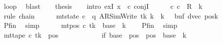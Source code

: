 \begin{isabellebody}
\ loop\ \isamarkupfalse%
\ blast\isanewline
\ \ \isamarkupfalse%
\ {\isacharquery}{\kern0pt}thesis\isanewline
\ \ \isamarkupfalse%
\ {\isacharparenleft}{\kern0pt}intro\ exI{\isacharbrackleft}{\kern0pt}\ x\ {\isacharequal}{\kern0pt}\ c{\isacharprime}{\kern0pt}{\isacharbrackright}{\kern0pt}\ conjI{\isacharparenright}{\kern0pt}\isanewline
\ \ \ \ \isamarkupfalse%
\ {\isachardoublequoteopen}{\isacharparenleft}{\kern0pt}c{}{\isacharcomma}{\kern0pt}\ c{\isacharprime}{\kern0pt}{\isacharparenright}{\kern0pt}\ {\isasymin}\ R{\isacharprime}{\kern0pt}\ {\isacharcircum}{\kern0pt}{\isacharcircum}{\kern0pt}\ {\isacharparenleft}{\kern0pt}{\isacharquery}{\kern0pt}k\ {\isacharminus}{\kern0pt}\ {}{\isacharparenright}{\kern0pt}{\isachardoublequoteclose}\isanewline
\ \ \ \ \ \ \isamarkupfalse%
\ {\isacharparenleft}{\kern0pt}rule\ chain{\isacharparenright}{\kern0pt}\isanewline
\ \ \ \ \isamarkupfalse%
\ {\isachardoublequoteopen}mt{\isacharunderscore}{\kern0pt}state\ c{\isacharprime}{\kern0pt}\ {\isacharequal}{\kern0pt}\ {\isacharparenleft}{\kern0pt}q{\isacharcomma}{\kern0pt}\ AR{\isacharunderscore}{\kern0pt}SimWrite{\isacharcomma}{\kern0pt}\ tk{\isacharcomma}{\kern0pt}\ {\isacharquery}{\kern0pt}k\ {\isacharplus}{\kern0pt}\ {\isacharparenleft}{\kern0pt}{\isacharquery}{\kern0pt}k\ {\isacharminus}{\kern0pt}\ {}{\isacharparenright}{\kern0pt}{\isacharcomma}{\kern0pt}\ buf{\isacharcomma}{\kern0pt}\ dvec{\isacharcomma}{\kern0pt}\ posk{\isacharparenright}{\kern0pt}{\isachardoublequoteclose}\isanewline
\ \ \ \ \ \ \isamarkupfalse%
\ Pfin\ \isamarkupfalse%
\ simp\isanewline
\ \ \ \ \isamarkupfalse%
\ {\isachardoublequoteopen}mt{\isacharunderscore}{\kern0pt}pos\ c{\isacharprime}{\kern0pt}\ tk\ {\isacharequal}{\kern0pt}\ base\ {\isacharplus}{\kern0pt}\ {\isacharparenleft}{\kern0pt}{\isacharquery}{\kern0pt}k\ {\isacharminus}{\kern0pt}\ {}{\isacharparenright}{\kern0pt}{\isachardoublequoteclose}\ \isamarkupfalse%
\ Pfin\ \isamarkupfalse%
\ simp\isanewline
\ \ \ \ \isamarkupfalse%
\ {\isachardoublequoteopen}mt{\isacharunderscore}{\kern0pt}tape\ c{\isacharprime}{\kern0pt}\ tk\ {\isacharequal}{\kern0pt}\ {\isacharparenleft}{\kern0pt}{\isasymlambda}pos{\isachardot}{\kern0pt}\isanewline
\ \ \ \ \ \ \ \ \ \ \ \ if\ base\ {\isasymle}\ pos\ {\isasymand}\ pos\ {\isacharless}{\kern0pt}\ base\ {\isacharplus}{\kern0pt}\ {\isacharparenleft}{\kern0pt}{\isacharquery}{\kern0pt}k\ {\isacharminus}{\kern0pt}\ {}{\isacharparenright}{\kern0pt}\isanewline

\end{isabellebody}
